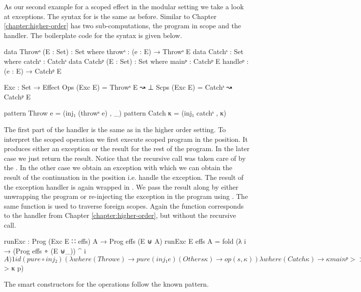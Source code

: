 As our second example for a scoped effect in the modular setting we take a look
at exceptions.
The syntax for  is the same as before.
Similar to Chapter \ref{chapter:higher-order}  has two
sub-computations, the program in scope and the handler.
The boilerplate code for the syntax is given below.

\begin{code}
data Throwˢ (E : Set)  : Set where throwˢ : (e : E) → Throwˢ E
data Catchˢ            : Set where catchˢ : Catchˢ
data Catchᵖ (E : Set)  : Set where
  mainᵖ    : Catchᵖ E
  handleᵖ  : (e : E) → Catchᵖ E

Exc : Set → Effect
Ops   (Exc E) = Throwˢ E  ↝ ⊥
Scps  (Exc E) = Catchˢ    ↝ Catchᵖ E

pattern Throw  e = (inj₁ (throwˢ e) , _)
pattern Catch  κ = (inj₁ catchˢ , κ)
\end{code}
The first part of the handler is the same as in the higher order setting.
To interpret the scoped operation  we first execute scoped
program in the  position.
It produces either an exception or the result for the rest of the program.
In the later case we just return the result.
Notice that the recursive call was taken care of by the .
In the other case we obtain an exception  with which we can
obtain the result of the continuation in the 
position i.e. handle the exception.
The result of the exception handler is again wrapped in .
We pass the result along by either unwrapping the program or re-injecting the
exception in the program using .
The same function is used to traverse foreign scopes.
Again the function corresponds to the handler from Chapter
\ref{chapter:higher-order}, but without the recursive call.

\begin{code}
runExc : Prog (Exc E ∷ effs) A → Prog effs (E ⊎ A)
runExc {E} {effs} {A} = fold (λ i → (Prog effs ∘ (E ⊎_)) ^ i $ A) 1 id
  (pure ∘ inj₂)
  ( λ where
    (Throw e)    → pure (inj₁ e)
    (Other s κ)  → op (s , κ)
  ) λ where
    (Catch κ) → κ mainᵖ >>= λ where
      (inj₁ e)  → κ (handleᵖ e) >>= [ pure ∘ inj₁ , id ]
      (inj₂ x)  → x
    (Other s κ) → scp (s , λ p → [ pure ∘ inj₁ , id ] <$> κ p)
\end{code}
The smart constructors for the operations follow the known pattern.

